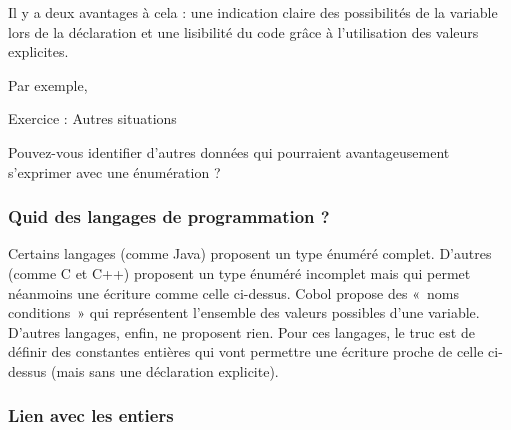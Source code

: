 
			Il y a deux avantages à cela : une indication claire des possibilités de
			la variable lors de la déclaration et une lisibilité du code grâce à
			l'utilisation des valeurs explicites.
			
			Par exemple, 
			


			\begin{Emphase}[exercice]{Exercice : Autres situations}

				Pouvez-vous identifier d'autres données qui pourraient
				avantageusement s'exprimer avec une énumération ?

			\end{Emphase}
			
			\subsubsection*{Quid des langages de programmation ?}

				Certains langages (comme Java) proposent un type énuméré complet.
				D'autres (comme C et C++) proposent un type énuméré
				incomplet mais qui permet néanmoins une écriture comme celle ci-dessus.
				Cobol propose des «~noms conditions~» qui représentent
				l'ensemble des valeurs possibles
				d'une variable. D'autres langages,
				enfin, ne proposent rien. Pour ces langages, le truc est de définir des
				constantes entières qui vont permettre une écriture proche de celle
				ci-dessus (mais sans une déclaration explicite).

			\subsubsection*{Lien avec les entiers}

